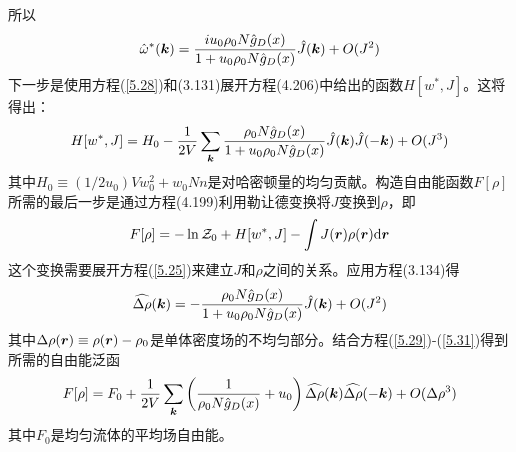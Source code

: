 所以
\begin{equation*}
\hat{\omega}^*(\bm{k})=\frac{iu_0\rho_0N\hat{g}_D(x)}{1+u_0\rho_0N\hat{g}_D(x)}\hat{J}(\bm{k})+O(J^2)
\end{equation*}
下一步是使用方程(\ref{5.28})和(3.131)展开方程(4.206)中给出的函数$H[w^*,J]$。这将得出：
\begin{equation}\label{5.29}
H[w^*,J]=H_0-\frac{1}{2V}\sum\limits_{\bm{k}}\frac{\rho_0N\hat{g}_D(x)}{1+u_0\rho_0N\hat{g}_D(x)}\hat{J}(\bm{k})\hat{J}(-\bm{k})+O(J^3)
\end{equation}
其中$H_0\equiv(1/2u_0)Vw_0^2+w_0Nn$是对哈密顿量的均匀贡献。构造自由能函数$F[\rho]$所需的最后一步是通过方程(4.199)利用勒让德变换将$J$变换到$\rho$，即
\begin{equation}\label{5.30}
F[\rho]=-\ln\mathcal{Z}_0+H[w^*,J]-\int J(\bm{r})\rho(\bm{r})\mathrm{d}\bm{r}
\end{equation}
这个变换需要展开方程(\ref{5.25})来建立$J$和$\rho$之间的关系。应用方程(3.134)得
\begin{equation}\label{5.31}
\widehat{\Delta\rho}(\bm{k})=-\frac{\rho_0N\hat{g}_D(x)}{1+u_0\rho_0N\hat{g}_D(x)}\hat{J}(\bm{k})+O(J^2)
\end{equation}
其中$\Delta\rho(\bm{r})\equiv\rho(\bm{r})-\rho_0$是单体密度场的不均匀部分。结合方程(\ref{5.29})-(\ref{5.31})得到所需的自由能泛函
\begin{equation}\label{5.32}
F[\rho]=F_0+\frac{1}{2V}\sum\limits_{\bm{k}}\left(\frac{1}{\rho_0N\hat{g}_D(x)}+u_0\right)\widehat{\Delta\rho}(\bm{k})\widehat{\Delta\rho}(-\bm{k})+O(\Delta\rho^3)
\end{equation}
其中$F_0$是均匀流体的平均场自由能。

